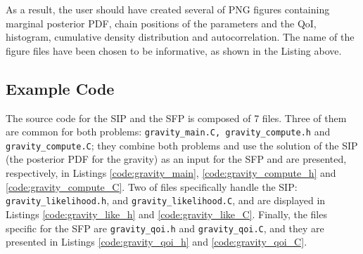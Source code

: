 As a result, the user should have created several of PNG figures containing marginal posterior PDF, chain positions of the parameters and the QoI, histogram, cumulative density distribution and autocorrelation. The name of the figure files have been chosen to be informative, as shown in the Listing above.



\subsection{Example Code}\label{sec:gravity_code}

The source code for the SIP and the SFP is composed of 7 files.
Three of them are common for both problems: \texttt{gravity\_main.C, gravity\_compute.h} and \texttt{gravity\_compute.C}; they combine both problems and use the solution of the SIP (the posterior PDF for the gravity) as an input for the SFP and are presented, respectively, in Listings \ref{code:gravity_main}, \ref{code:gravity_compute_h} and \ref{code:gravity_compute_C}.
Two of files specifically  handle the SIP: \texttt{gravity\_likelihood.h}, and \texttt{gravity\_likelihood.C}, and are displayed in Listings \ref{code:gravity_like_h} and \ref{code:gravity_like_C}. Finally, the files specific for the SFP are \texttt{gravity\_qoi.h} and \texttt{gravity\_qoi.C}, and they are presented in Listings \ref{code:gravity_qoi_h} and \ref{code:gravity_qoi_C}.


 









